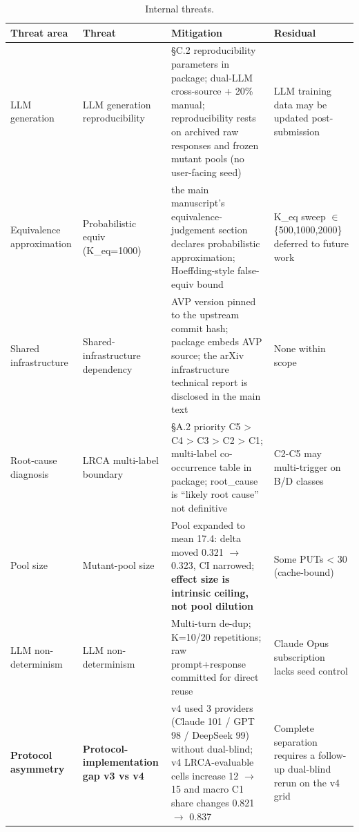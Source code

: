 \documentclass[manuscript,screen,review]{acmart}
\begin{document}
{%
\begin{longtable}[]{@{}
  >{\raggedright\arraybackslash}p{}
  >{\raggedright\arraybackslash}p{}
  >{\raggedright\arraybackslash}p{}
  >{\raggedright\arraybackslash}p{}@{}}
\caption{Internal threats.}\label{tab:p2-27}\\
\toprule\noalign{}
\begin{minipage}[b]{\linewidth}\raggedright
Threat area
\end{minipage} & \begin{minipage}[b]{\linewidth}\raggedright
Threat
\end{minipage} & \begin{minipage}[b]{\linewidth}\raggedright
Mitigation
\end{minipage} & \begin{minipage}[b]{\linewidth}\raggedright
Residual
\end{minipage} \\
\midrule\noalign{}
\endfirsthead
\endhead
\bottomrule\noalign{}
\endlastfoot
LLM generation & LLM generation reproducibility & §C.2 reproducibility parameters in
package; dual-LLM cross-source + 20\% manual; reproducibility rests on
archived raw responses and frozen mutant pools (no user-facing seed) & LLM training data may be updated
post-submission \\
Equivalence approximation & Probabilistic equiv (K\_eq=1000) & the main manuscript's equivalence-judgement section declares probabilistic
approximation; Hoeffding-style false-equiv bound & K\_eq sweep $\in$
\{500,1000,2000\} deferred to future work \\
Shared infrastructure & Shared-infrastructure dependency & AVP version pinned to the upstream commit hash;
package embeds AVP source; the arXiv infrastructure technical report is disclosed in the main text &
None within scope \\
Root-cause diagnosis & LRCA multi-label boundary & §A.2 priority
C5 \textgreater{} C4 \textgreater{} C3 \textgreater{} C2 \textgreater{} C1;
multi-label co-occurrence table in package; root\_cause is ``likely root
cause'' not definitive & C2-C5 may multi-trigger on B/D classes \\
Pool size & Mutant-pool size & Pool expanded to mean 17.4: delta moved 0.321 $\to$
0.323, CI narrowed; \textbf{effect size is intrinsic ceiling, not pool
dilution} & Some PUTs \textless{} 30 (cache-bound) \\
LLM non-determinism & LLM non-determinism & Multi-turn de-dup; K=10/20 repetitions; raw
prompt+response committed for direct reuse & Claude Opus subscription
lacks seed control \\
\textbf{Protocol asymmetry} & \textbf{Protocol-implementation gap v3 vs v4} & v4 used 3
providers (Claude 101 / GPT 98 / DeepSeek 99) without dual-blind; v4
LRCA-evaluable cells increase 12 $\to$ 15 and macro C1 share changes
0.821 $\to$ 0.837 & Complete separation requires a follow-up dual-blind rerun on
the v4 grid \\
\end{longtable}
}
\end{document}
